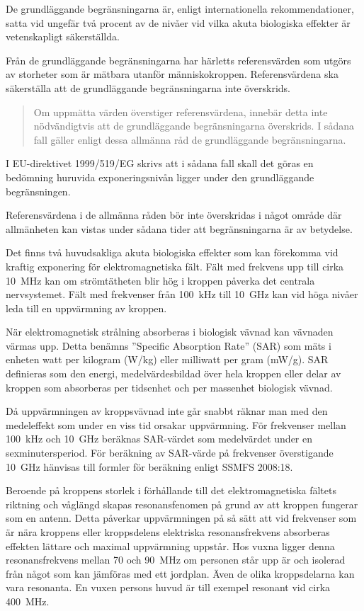 De grundläggande begränsningarna är, enligt internationella rekommendationer,
satta vid ungefär två procent av de nivåer vid vilka akuta biologiska effekter
är vetenskapligt säkerställda.

Från de grundläggande begränsningarna har härletts referensvärden som utgörs
av storheter som är mätbara utanför människokroppen.
Referensvärdena ska säkerställa att de grundläggande begränsningarna inte
överskrids.

\begin{quote}
	Om uppmätta värden överstiger referensvärdena, innebär detta inte nödvändigtvis
	att de grundläggande begränsningarna överskrids. I sådana fall gäller enligt
	dessa allmänna råd de grundläggande begränsningarna.
\end{quote}

I EU-direktivet 1999/519/EG \cite{1999/519/EG} skrivs att i sådana fall skall det
göras en bedömning huruvida exponeringsnivån ligger under den grundläggande
begränsningen.

Referensvärdena i de allmänna råden bör inte överskridas i något område där
allmänheten kan vistas under sådana tider att begränsningarna är av betydelse.

Det finns två huvudsakliga akuta biologiska effekter som kan förekomma vid
kraftig exponering för elektromagnetiska fält.
Fält med frekvens upp till cirka 10~MHz kan om strömtätheten blir hög i kroppen
påverka det centrala nervsystemet.
Fält med frekvenser från 100~kHz till 10~GHz kan vid höga nivåer leda till en
uppvärmning av kroppen.

När elektromagnetisk strålning absorberas i biologisk vävnad kan vävnaden värmas
upp.
Detta benämns ''Specific Absorption Rate'' (SAR) som mäts i enheten watt per
kilogram (W/kg) eller milliwatt per gram (mW/g).
SAR definieras som den energi, medelvärdesbildad över hela kroppen eller delar
av kroppen som absorberas per tidsenhet och per massenhet biologisk vävnad.

Då uppvärmningen av kroppsvävnad inte går snabbt räknar man med den medeleffekt
som under en viss tid orsakar uppvärmning.
För frekvenser mellan 100~kHz och 10~GHz beräknas SAR-värdet som medelvärdet under
en sexminutersperiod.
För beräkning av SAR-värde på frekvenser överstigande 10~GHz hänvisas till
formler för beräkning enligt SSMFS 2008:18.

Beroende på kroppens storlek i förhållande till det elektromagnetiska fältets
riktning och våglängd skapas resonansfenomen på grund av att kroppen fungerar
som en antenn.
Detta påverkar uppvärmningen på så sätt att vid frekvenser som är nära kroppens
eller kroppsdelens elektriska resonansfrekvens absorberas effekten lättare och
maximal uppvärmning uppstår.
Hos vuxna ligger denna resonansfrekvens mellan 70 och 90~MHz om personen står
upp är och isolerad från något som kan jämföras med ett jordplan.
Även de olika kroppsdelarna kan vara resonanta.
En vuxen persons huvud är till exempel resonant vid cirka 400~MHz.

